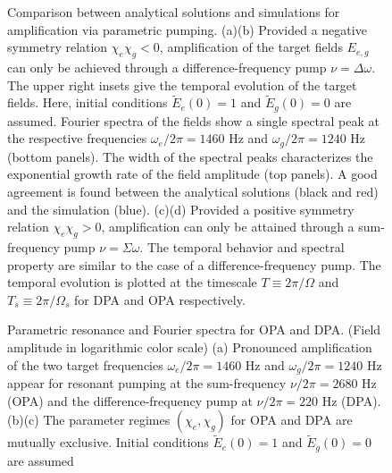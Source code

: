 \documentclass[aps,prl,nobibnotes,nofootinbib,showpacs,reprint]{revtex4-1}
\newcommand{\we}{\omega_{e}}
\newcommand{\wg}{\omega_{g}}
\newcommand{\chie}{\chi_{e}}
\newcommand{\chig}{\chi_{g}}
\newcommand{\Dw}{\Delta \omega}
\newcommand{\Sw}{\Sigma \omega}
\newcommand{\Wm}{\Omega}
\newcommand{\Wms}{\Omega_{s}}
\begin{document}
\begin{figure}[t]
\centering
{}
\caption{Comparison between analytical solutions and simulations for amplification via parametric pumping. (a)(b) Provided a negative symmetry relation $\chie\chig < 0$, amplification of the target fields $E_{e,g}$ can only be achieved through a difference-frequency pump $\nu = \Dw$. The upper right insets give the temporal evolution of the target fields. Here, initial conditions $\tilde{E}_{e}(0) = 1$ and $\tilde{E}_{g}(0) = 0$ are assumed. Fourier spectra of the fields show a single spectral peak at the respective frequencies $\we/2\pi = 1460$ Hz and $\wg/2\pi = 1240$ Hz (bottom panels). The width of the spectral peaks characterizes the exponential growth rate of the field amplitude (top panels). A good agreement is found between the analytical solutions (black and red) and the simulation (blue). (c)(d) Provided a positive symmetry relation $\chie\chig > 0$, amplification can only be attained through a sum-frequency pump $\nu = \Sw$. The temporal behavior and spectral property are similar to the case of a difference-frequency pump. The temporal evolution is plotted at the timescale $T \equiv 2\pi/\Wm$ and $T_{s} \equiv 2\pi/\Wms$ for DPA and OPA respectively.}
\label{fig:FFT_traj}
\end{figure}

\begin{figure}[t]
\centering
{}
\caption{Parametric resonance and Fourier spectra for OPA and DPA. (Field amplitude in logarithmic color scale) (a) Pronounced amplification of the two target frequencies $\we/2\pi = 1460$ Hz and $\wg/2\pi = 1240$ Hz appear for resonant pumping at the sum-frequency $\nu/2\pi = 2680$ Hz (OPA) and the difference-frequency pump at $\nu/2\pi = 220$ Hz (DPA). (b)(c) The parameter regimes $(\chie, \chig)$ for OPA and DPA are mutually exclusive. Initial conditions $\tilde{E}_{e}(0) = 1$ and $\tilde{E}_{g}(0) = 0$ are assumed}
\label{fig:drivingw_FFT}
\end{figure}
\end{document}
